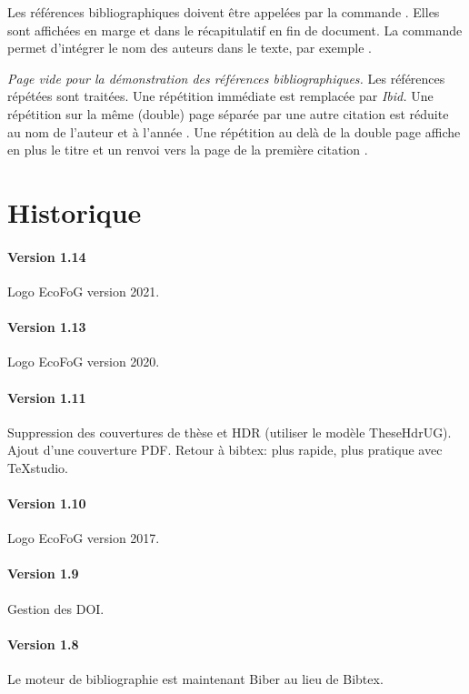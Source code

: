 \documentclass[
  a4paper, %
  11pt, extrafontsizes, %
  onecolumn, %
  openright, %
]{memoir}
\begin{document}
Les références bibliographiques doivent être appelées par la commande . 
Elles sont affichées en marge \autocite{Rao1985} et dans le récapitulatif en fin de document.
La commande  permet d'intégrer le nom des auteurs dans le texte, par exemple \textcite{Rao1985}.

\newpage 
\textit{Page vide pour la démonstration des références bibliographiques.}
\newpage 
Les références répétées \autocite{Pelissier2001} sont traitées.
Une répétition immédiate est remplacée par \textit{Ibid.} \autocite{Pelissier2001}
Une répétition sur la même (double) page séparée par une autre citation \autocite{Rao1985} est réduite au nom de l'auteur et à l'année \autocite{Pelissier2001}.
Une répétition au delà de la double page affiche en plus le titre et un renvoi vers la page de la première citation \autocite{Rao1985}.


\section{Historique}

\paragraph{Version 1.14}
Logo EcoFoG version 2021.

\paragraph{Version 1.13}
Logo EcoFoG version 2020.

\paragraph{Version 1.11}
Suppression des couvertures de thèse et HDR (utiliser le modèle TheseHdrUG).
Ajout d'une couverture PDF.
Retour à bibtex: plus rapide, plus pratique avec TeXstudio.

\paragraph{Version 1.10}
Logo EcoFoG version 2017.

\paragraph{Version 1.9}
Gestion des DOI.

\paragraph{Version 1.8}
Le moteur de bibliographie est maintenant Biber au lieu de Bibtex.
\end{document}
